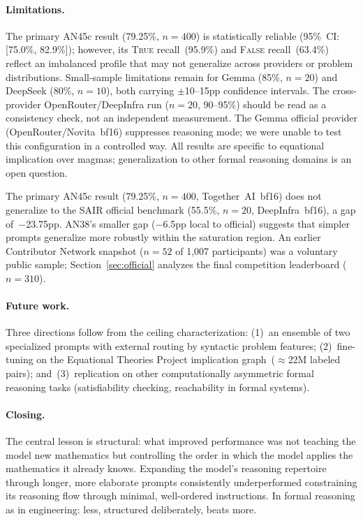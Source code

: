 \documentclass[11pt]{article}
\begin{document}
\paragraph{Limitations.}
The primary AN45c result (79.25\%, $n=400$) is statistically reliable
(95\%~CI: [75.0\%, 82.9\%]); however, its \textsc{True} recall~(95.9\%)
and \textsc{False} recall~(63.4\%) reflect an imbalanced profile that
may not generalize across providers or problem distributions. Small-sample
limitations remain for Gemma (85\%, $n=20$) and DeepSeek (80\%, $n=10$),
both carrying $\pm$10--15pp confidence intervals. The cross-provider
OpenRouter/DeepInfra run ($n=20$, 90--95\%) should be read as a
consistency check, not an independent measurement. The Gemma official
provider (OpenRouter/Novita~bf16) suppresses reasoning mode; we were
unable to test this configuration in a controlled way. All results are
specific to equational implication over magmas; generalization to other
formal reasoning domains is an open question.

The primary AN45c result (79.25\%, $n=400$, Together~AI~bf16) does not
generalize to the SAIR official benchmark (55.5\%, $n=20$,
DeepInfra~bf16), a gap of~$-$23.75pp. AN38's smaller gap ($-$6.5pp
local to official) suggests that simpler prompts generalize more
robustly within the saturation region. An earlier Contributor Network
snapshot ($n{=}52$ of 1{,}007 participants) was a voluntary public
sample; Section~\ref{sec:official} analyzes the final competition
leaderboard ($n{=}310$).

\paragraph{Future work.}
Three directions follow from the ceiling characterization: (1)~an
ensemble of two specialized prompts with external routing by syntactic
problem features; (2)~fine-tuning on the Equational Theories Project
implication graph~($\approx$22M labeled pairs); and~(3)~replication
on other computationally asymmetric formal reasoning tasks
(satisfiability checking, reachability in formal systems).

\paragraph{Closing.}
The central lesson is structural: what improved performance was not
teaching the model new mathematics but controlling the order in which
the model applies the mathematics it already knows. Expanding the
model's reasoning repertoire through longer, more elaborate prompts
consistently underperformed constraining its reasoning flow through
minimal, well-ordered instructions. In formal reasoning as in
engineering: less, structured deliberately, beats more.



\end{document}
